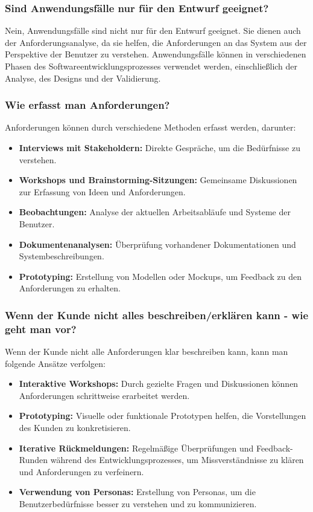 \documentclass[main.tex]{subfiles}
\begin{document}
\subsubsection*{Sind Anwendungsfälle nur für den Entwurf geeignet?}
Nein, Anwendungsfälle sind nicht nur für den Entwurf geeignet. Sie dienen auch der Anforderungsanalyse, da sie helfen, die Anforderungen an das System aus der Perspektive der Benutzer zu verstehen. Anwendungsfälle können in verschiedenen Phasen des Softwareentwicklungsprozesses verwendet werden, einschließlich der Analyse, des Designs und der Validierung.

\subsubsection*{Wie erfasst man Anforderungen?}
Anforderungen können durch verschiedene Methoden erfasst werden, darunter:
\begin{itemize}
    \item \textbf{Interviews mit Stakeholdern:} Direkte Gespräche, um die Bedürfnisse zu verstehen.
    \item \textbf{Workshops und Brainstorming-Sitzungen:} Gemeinsame Diskussionen zur Erfassung von Ideen und Anforderungen.
    \item \textbf{Beobachtungen:} Analyse der aktuellen Arbeitsabläufe und Systeme der Benutzer.
    \item \textbf{Dokumentenanalysen:} Überprüfung vorhandener Dokumentationen und Systembeschreibungen.
    \item \textbf{\gls{Prototyping}:} Erstellung von Modellen oder Mockups, um Feedback zu den Anforderungen zu erhalten.
\end{itemize}


\subsubsection*{Wenn der Kunde nicht alles beschreiben/erklären kann - wie geht man vor?}
Wenn der Kunde nicht alle Anforderungen klar beschreiben kann, kann man folgende Ansätze verfolgen:
\begin{itemize}
    \item \textbf{Interaktive Workshops:} Durch gezielte Fragen und Diskussionen können Anforderungen schrittweise erarbeitet werden.
    \item \textbf{\gls{Prototyping}:} Visuelle oder funktionale Prototypen helfen, die Vorstellungen des Kunden zu konkretisieren.
    \item \textbf{Iterative Rückmeldungen:} Regelmäßige Überprüfungen und Feedback-Runden während des Entwicklungsprozesses, um Missverständnisse zu klären und Anforderungen zu verfeinern.
    \item \textbf{Verwendung von Personas:} Erstellung von Personas, um die Benutzerbedürfnisse besser zu verstehen und zu kommunizieren.
\end{itemize}
\end{document}
